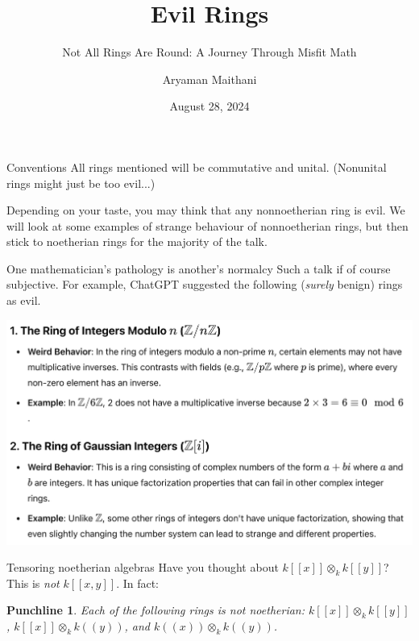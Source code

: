\documentclass{beamer}
\title{Evil Rings}
\subtitle{\footnotesize Not All Rings Are Round: A Journey Through Misfit Math}
\date{August 28, 2024}
\author{Aryaman Maithani}
\institute{University of Utah}
\newtheorem{punchline}[theorem]{Punchline}
\begin{document}
	\maketitle

	\begin{frame}{Conventions}
		All rings mentioned will be commutative and unital. \pause \newline
		\phantom{h} \hfill {\tiny (Nonunital rings might just be too evil...)} \pause

		Depending on your taste, you may think that any nonnoetherian ring is evil. \pause We will look at some examples of strange behaviour of nonnoetherian rings, but then stick to noetherian rings for the majority of the talk.
	\end{frame}

	\begin{frame}{One mathematician's pathology is another's normalcy}
		Such a talk if of course subjective. For example, ChatGPT \cite{ChatGPT} suggested the following (\emph{surely} benign) rings as evil. \pause

		\includegraphics[width=\textwidth]{figs/chat-gpt-evil.png}
	\end{frame}

	\begin{frame}{Tensoring noetherian algebras}
		Have you thought about $k[\![x]\!] \otimes_{k} k[\![y]\!]$? \pause This is \emph{not} $k[\![x, y]\!]$. \pause In fact: 
		\begin{punchline}
			Each of the following rings is not noetherian: \pause $k[\![x]\!] \otimes_{k} k[\![y]\!]$, \pause $k[\![x]\!] \otimes_{k} k(\!(y)\!)$, \pause and $k(\!(x)\!) \otimes_{k} k(\!(y)\!)$.
		\end{punchline} %
	\end{frame}
\end{document}

